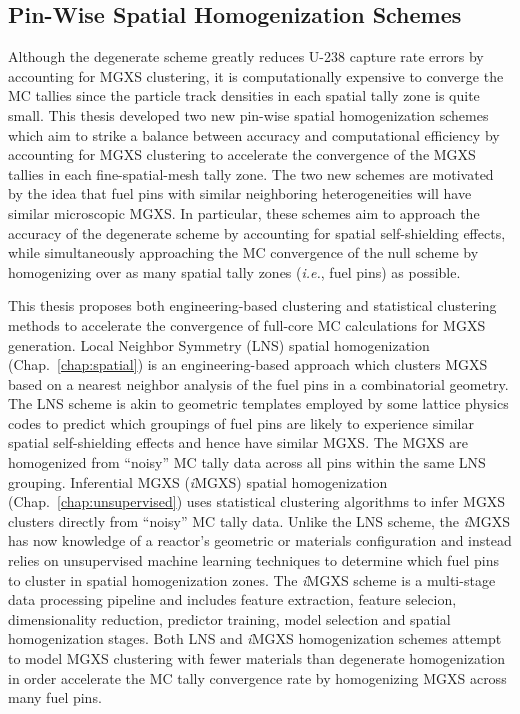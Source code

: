 
\subsection{Pin-Wise Spatial Homogenization Schemes}
\label{subsec:chap12-homogenization-schemes}

Although the degenerate scheme greatly reduces U-238 capture rate errors by accounting for \ac{MGXS} clustering, it is computationally expensive to converge the \ac{MC} tallies since the particle track densities in each spatial tally zone is quite small. This thesis developed two new pin-wise spatial homogenization schemes which aim to strike a balance between accuracy and computational efficiency by accounting for \ac{MGXS} clustering to accelerate the convergence of the \ac{MGXS} tallies in each fine-spatial-mesh tally zone. The two new schemes are motivated by the idea that fuel pins with similar neighboring heterogeneities will have similar microscopic \ac{MGXS}. In particular, these schemes aim to approach the accuracy of the degenerate scheme by accounting for spatial self-shielding effects, while simultaneously approaching the \ac{MC} convergence of the null scheme by homogenizing over as many spatial tally zones (\textit{i.e.}, fuel pins) as possible.


This thesis proposes both engineering-based clustering and statistical clustering methods to accelerate the convergence of full-core \ac{MC} calculations for \ac{MGXS} generation. Local Neighbor Symmetry (LNS) spatial homogenization (Chap.~\ref{chap:spatial}) is an engineering-based approach which clusters \ac{MGXS} based on a nearest neighbor analysis of the fuel pins in a combinatorial geometry. The \ac{LNS} scheme is akin to geometric templates employed by some lattice physics codes to predict which groupings of fuel pins are likely to experience similar spatial self-shielding effects and hence have similar \ac{MGXS}. The MGXS are homogenized from ``noisy'' \ac{MC} tally data across all pins within the same \ac{LNS} grouping. Inferential \ac{MGXS} (\textit{i}\ac{MGXS}) spatial homogenization (Chap.~\ref{chap:unsupervised}) uses statistical clustering algorithms to infer \ac{MGXS} clusters directly from ``noisy'' \ac{MC} tally data. Unlike the \ac{LNS} scheme, the \textit{i}\ac{MGXS} has now knowledge of a reactor's geometric or materials configuration and instead relies on unsupervised machine learning techniques to determine which fuel pins to cluster in spatial homogenization zones. The \textit{i}\ac{MGXS} scheme is a multi-stage data processing pipeline and includes feature extraction, feature selecion, dimensionality reduction, predictor training, model selection and spatial homogenization stages. Both \ac{LNS} and \textit{i}\ac{MGXS} homogenization schemes attempt to model \ac{MGXS} clustering with fewer materials than degenerate homogenization in order accelerate the \ac{MC} tally convergence rate by homogenizing \ac{MGXS} across many fuel pins.

